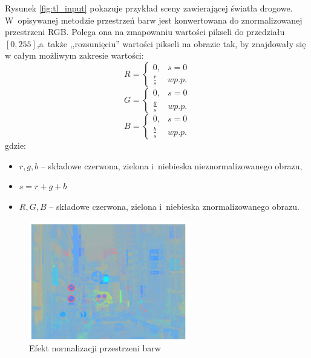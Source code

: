 Rysunek \ref{fig:tl_input} pokazuje przykład sceny zawierającej światła drogowe. 
W~opisywanej metodzie przestrzeń barw jest konwertowana do znormalizowanej przestrzeni RGB. 
Polega ona na zmapowaniu wartości pikseli do przedziału $[0,255]$,a~także ,,rozsunięciu'' wartości pikseli na obrazie tak, by znajdowały się w całym możliwym zakresie wartości:
\begin{equation}
R=\left\{\begin{matrix}
0, &  s=0\\
\frac{r}{s} & w p.p.
\end{matrix}\right.
\end{equation}
\begin{equation}
G=\left\{\begin{matrix}
0, &  s=0\\
\frac{g}{s} & w p.p.
\end{matrix}\right.
\end{equation}
\begin{equation}
B=\left\{\begin{matrix}
0, &  s=0\\
\frac{b}{s} & w p.p.
\end{matrix}\right.
\end{equation}
gdzie:
\begin{itemize}
\item$r,g,b$ -- składowe czerwona, zielona i~niebieska nieznormalizowanego obrazu,
\item$s = r+g+b$
\item$R,G,B$ -- składowe czerwona, zielona i~niebieska znormalizowanego obrazu.
\end{itemize}


\begin{figure}
  \centering
  \includegraphics[width=7cm]{img/tl_norm.png}
  \caption{Efekt normalizacji przestrzeni barw\cite{T4}}
  \label{fig:tl_norm}
\end{figure}

